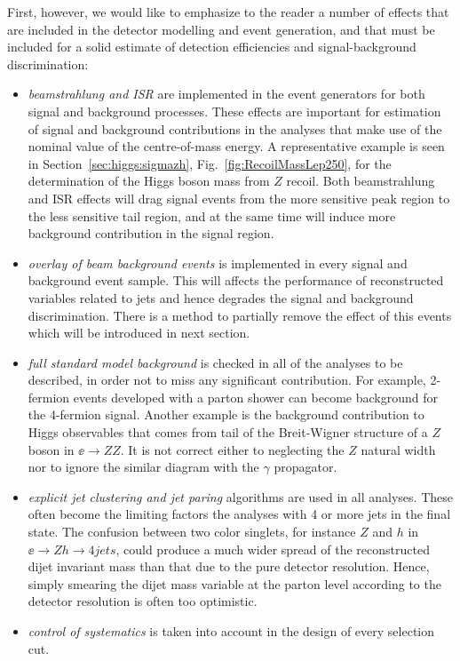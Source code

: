 First, however, we would like to emphasize to the reader a number
of effects that are included in the detector modelling and event
generation, and that must be included for a solid estimate of
detection efficiencies and signal-background discrimination:
\begin{itemize}
\item {\it beamstrahlung and ISR}
are implemented in the event generators for both signal and background processes.
These effects are important for estimation of 
signal and background contributions in the analyses that make use of the 
nominal value of the centre-of-mass energy. A representative example is seen in
Section~\ref{sec:higgs:sigmazh}, Fig.~\ref{fig:RecoilMassLep250}, for
the determination of the Higgs boson mass from $Z$ recoil. 
Both beamstrahlung and ISR effects will drag signal events
from the more sensitive peak region to the less sensitive tail region,
and at the same time will induce more background contribution in the signal region.
\item {\it overlay of beam background events} is implemented in every signal 
and background event sample.  This will affects the performance of 
reconstructed variables related to jets and  hence degrades the signal and background
discrimination. There is a method to partially remove the effect of
this events which will 
be introduced in next section. 
\item {\it full standard model background} is checked in all of  the
  analyses to be described,
in order not to miss any significant contribution. For example,  2-fermion 
events developed with a parton shower can   become background for the  4-fermion signal.
Another example is the background contribution to  Higgs observables
that 
comes from tail of the Breit-Wigner structure of a $Z$ boson in
$\ee\to ZZ$.   It is not correct either to neglecting the 
$Z$ natural width nor to ignore the  similar diagram with the $\gamma$ propagator.
\item {\it explicit jet clustering and jet paring} algorithms are used
  in all analyses.   These often become the 
limiting factors the analyses with 4 or more jets  in the final state.
The confusion between two color singlets, for instance $Z$ and $h$ in $\ee\to Zh\to 4 jets$,
could produce a much wider spread of the reconstructed dijet invariant mass
than that due to  the pure detector resolution. Hence,  simply
smearing the  dijet mass variable 
at the parton level according to the detector resolution is often too optimistic. 
\item {\it control of systematics} is taken into account in the design of every
selection cut.
\end{itemize}



